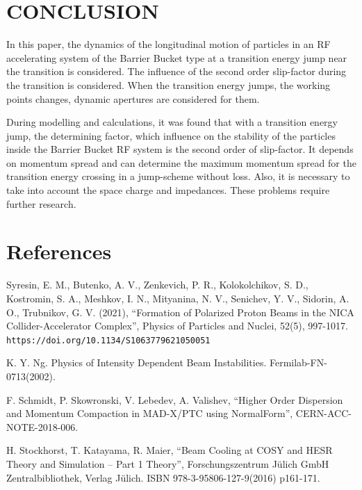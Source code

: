 \documentclass[a4paper]{jpconf}
\begin{document}
\section{CONCLUSION}

\par In this paper, the dynamics of the longitudinal motion of particles in an RF accelerating system of the Barrier Bucket type at a transition energy jump near the transition is considered. The influence of the second order slip-factor during the transition is considered. When the transition energy jumps, the working points changes, dynamic apertures are considered for them.
\par During modelling and calculations, it was found that with a transition energy jump, the determining factor, which influence on the stability of the particles inside the Barrier Bucket RF system is the second order of slip-factor. It depends on momentum spread and can determine the maximum momentum spread for the transition energy crossing in a jump-scheme without loss. Also, it is necessary to take into account the space charge and impedances. These problems require further research.


\section*{References}
\begin{thebibliography}{9}
 	Syresin, E. M., Butenko, A. V., Zenkevich, P. R., Kolokolchikov, S. D., Kostromin, S. A., Meshkov, I. N., Mityanina, N. V., Senichev, Y. V., Sidorin, A. O., Trubnikov, G. V. (2021), ``Formation of Polarized Proton Beams in the NICA Collider-Accelerator Complex'', Physics of Particles and Nuclei, 52(5), 997-1017. \verb"https://doi.org/10.1134/S1063779621050051"

 K. Y. Ng. Physics of Intensity Dependent Beam Instabilities. Fermilab-FN-0713(2002).

 F. Schmidt, P. Skowronski, V. Lebedev, A. Valishev, ``Higher Order Dispersion and Momentum Compaction in MAD-X/PTC using NormalForm'', CERN-ACC-NOTE-2018-006.

 H. Stockhorst, T. Katayama, R. Maier, ``Beam Cooling at COSY and HESR Theory and Simulation – Part 1 Theory'', Forschungszentrum Jülich GmbH Zentralbibliothek, Verlag Jülich. ISBN 978-3-95806-127-9(2016) p161-171.
\end{thebibliography}
\end{document}
